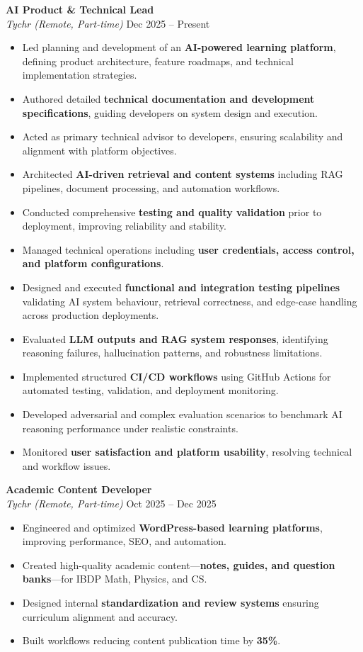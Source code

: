\documentclass[a4paper,10pt]{article}
\begin{document}
\textbf{AI Product \& Technical Lead}\\
\emph{Tychr (Remote, Part-time)} \hfill Dec 2025 -- Present
\begin{itemize}[leftmargin=*]
    \item Led planning and development of an \textbf{AI-powered learning platform}, defining product architecture, feature roadmaps, and technical implementation strategies.
    \item Authored detailed \textbf{technical documentation and development specifications}, guiding developers on system design and execution.
    \item Acted as primary technical advisor to developers, ensuring scalability and alignment with platform objectives.
    \item Architected \textbf{AI-driven retrieval and content systems} including RAG pipelines, document processing, and automation workflows.
    \item Conducted comprehensive \textbf{testing and quality validation} prior to deployment, improving reliability and stability.
    \item Managed technical operations including \textbf{user credentials, access control, and platform configurations}.
    \item Designed and executed \textbf{functional and integration testing pipelines} validating AI system behaviour, retrieval correctness, and edge-case handling across production deployments.
    \item Evaluated \textbf{LLM outputs and RAG system responses}, identifying reasoning failures, hallucination patterns, and robustness limitations.
    \item Implemented structured \textbf{CI/CD workflows} using GitHub Actions for automated testing, validation, and deployment monitoring.
    \item Developed adversarial and complex evaluation scenarios to benchmark AI reasoning performance under realistic constraints.
    \item Monitored \textbf{user satisfaction and platform usability}, resolving technical and workflow issues.
\end{itemize}

\textbf{Academic Content Developer}\\
\emph{Tychr (Remote, Part-time)} \hfill Oct 2025 -- Dec 2025
\begin{itemize}[leftmargin=*]
    \item Engineered and optimized \textbf{WordPress-based learning platforms}, improving performance, SEO, and automation.
    \item Created high-quality academic content—\textbf{notes, guides, and question banks}—for IBDP Math, Physics, and CS.
    \item Designed internal \textbf{standardization and review systems} ensuring curriculum alignment and accuracy.
    \item Built workflows reducing content publication time by \textbf{35\%}.
\end{itemize}
\end{document}
